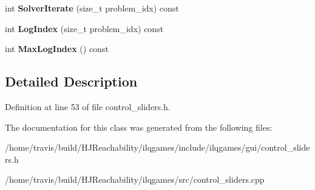 \begin{DoxyCompactItemize}
\item 
int {\bfseries Solver\+Iterate} (size\+\_\+t problem\+\_\+idx) const \hypertarget{classilqgames_1_1_control_sliders_a1963e1ac97100303f6d0ad8483e7340f}{}\label{classilqgames_1_1_control_sliders_a1963e1ac97100303f6d0ad8483e7340f}

\item 
int {\bfseries Log\+Index} (size\+\_\+t problem\+\_\+idx) const \hypertarget{classilqgames_1_1_control_sliders_ae5dd8db5d88f8d8c1d8e2a23b25e1ab5}{}\label{classilqgames_1_1_control_sliders_ae5dd8db5d88f8d8c1d8e2a23b25e1ab5}

\item 
int {\bfseries Max\+Log\+Index} () const \hypertarget{classilqgames_1_1_control_sliders_a370e35a28a451951d9cadcd58172b853}{}\label{classilqgames_1_1_control_sliders_a370e35a28a451951d9cadcd58172b853}

\end{DoxyCompactItemize}


\subsection{Detailed Description}


Definition at line 53 of file control\+\_\+sliders.\+h.



The documentation for this class was generated from the following files\+:\begin{DoxyCompactItemize}
\item 
/home/travis/build/\+H\+J\+Reachability/ilqgames/include/ilqgames/gui/control\+\_\+sliders.\+h\item 
/home/travis/build/\+H\+J\+Reachability/ilqgames/src/control\+\_\+sliders.\+cpp\end{DoxyCompactItemize}
